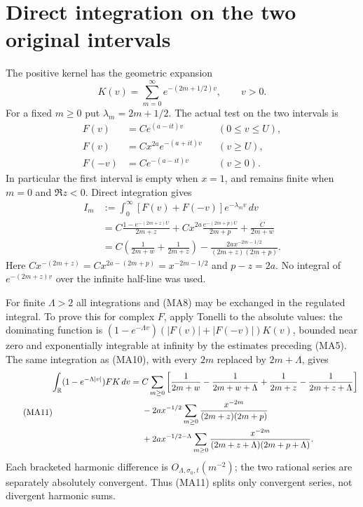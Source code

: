 \documentclass[11pt,a4paper]{article}
\providecommand{\dd}{\,d}
\begin{document}
\section{Direct integration on the two original intervals}
The positive kernel has the geometric expansion
\begin{equation}\tag{MA8}
 K(v)=\sum_{m=0}^\infty e^{-(2m+1/2)v},\qquad v>0.
\end{equation}
For a fixed $m\ge0$ put $\lambda_m=2m+1/2$. The actual test on the two
intervals is
\begin{equation}\tag{MA9}\begin{aligned}
 F(v)&=Ce^{(a-it)v}&& (0\le v\le U),\\
 F(v)&=Cx^{2a}e^{-(a+it)v}&& (v\ge U),\\
 F(-v)&=Ce^{-(a-it)v}&& (v\ge0).
\end{aligned}\end{equation}
In particular the first interval is empty when $x=1$, and remains finite
when $m=0$ and $\Re z<0$. Direct integration gives
\begin{equation}\tag{MA10}\begin{aligned}
 I_m&:=\int_0^\infty[F(v)+F(-v)]e^{-\lambda_m v}\dd v\\
 &=C\frac{1-e^{-(2m+z)U}}{2m+z}
   +Cx^{2a}\frac{e^{-(2m+p)U}}{2m+p}
   +\frac C{2m+w}\\
 &=C\left(\frac1{2m+w}+\frac1{2m+z}\right)
       -\frac{2a x^{-2m-1/2}}{(2m+z)(2m+p)}.
\end{aligned}\end{equation}
Here $Cx^{-(2m+z)}=Cx^{2a-(2m+p)}=x^{-2m-1/2}$ and $p-z=2a$.
No integral of $e^{-(2m+z)v}$ over the infinite half-line was used.

For finite $\Lambda>2$ all integrations and (MA8) may be exchanged in the
regulated integral. To prove this for complex $F$, apply Tonelli to the
absolute values: the dominating function is
$(1-e^{-\Lambda v})(|F(v)|+|F(-v)|)K(v)$, bounded near zero and
exponentially integrable at infinity by the estimates preceding (MA5).
The same integration as (MA10), with every $2m$ replaced by $2m+\Lambda$,
gives
\begin{equation}\tag{MA11}\begin{aligned}
 \int_\R(1-e^{-\Lambda|v|})FK\dd v
 ={}&C\sum_{m\ge0}\left[
 \frac1{2m+w}-\frac1{2m+w+\Lambda}
 +\frac1{2m+z}-\frac1{2m+z+\Lambda}\right]\\
 &-2a x^{-1/2}\sum_{m\ge0}
 \frac{x^{-2m}}{(2m+z)(2m+p)}\\
 &+2a x^{-1/2-\Lambda}\sum_{m\ge0}
 \frac{x^{-2m}}{(2m+z+\Lambda)(2m+p+\Lambda)}.
\end{aligned}\end{equation}
Each bracketed harmonic difference is $O_{\Lambda,\sigma_0,t}(m^{-2})$;
the two rational series are separately absolutely convergent. Thus (MA11)
splits only convergent series, not divergent harmonic sums.
\end{document}
